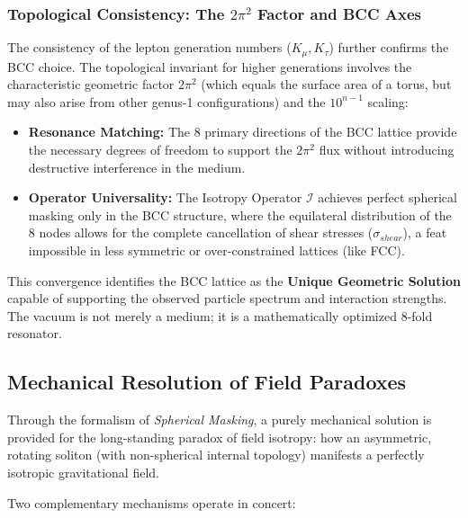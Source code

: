 \documentclass[10pt,a4paper]{article}
\begin{document}
\subsubsection{Topological Consistency: The $2\pi^2$ Factor and BCC Axes}
The consistency of the lepton generation numbers ($K_{\mu}, K_{\tau}$) further confirms the BCC choice. The topological invariant for higher generations involves the characteristic geometric factor $2\pi^2$ (which equals the surface area of a torus, but may also arise from other genus-1 configurations) and the $10^{n-1}$ scaling:
\begin{itemize}
	\item \textbf{Resonance Matching:} The 8 primary directions of the BCC lattice provide the necessary degrees of freedom to support the $2\pi^2$ flux without introducing destructive interference in the medium. 
	\item \textbf{Operator Universality:} The Isotropy Operator $\mathcal{I}$ achieves perfect spherical masking only in the BCC structure, where the equilateral distribution of the 8 nodes allows for the complete cancellation of shear stresses ($\sigma_{shear}$), a feat impossible in less symmetric or over-constrained lattices (like FCC).
\end{itemize}
This convergence identifies the BCC lattice as the \textbf{Unique Geometric Solution} capable of supporting the observed particle spectrum and interaction strengths. The vacuum is not merely a medium; it is a mathematically optimized $8$-fold resonator.

\subsection{Mechanical Resolution of Field Paradoxes}

Through the formalism of \textit{Spherical Masking}, a purely mechanical solution is provided for the long-standing paradox of field isotropy: how an asymmetric, rotating soliton (with non-spherical internal topology) manifests a perfectly isotropic gravitational field.

Two complementary mechanisms operate in concert:
\end{document}
